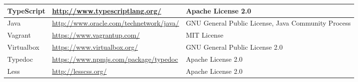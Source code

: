 			\begin{tabularx}{\linewidth}{|p{}|X|p{}|}
				\hline
				TypeScript & \url{http://www.typescriptlang.org/} & Apache License 2.0\\
				\hline
				Java & \url{http://www.oracle.com/technetwork/java/} & GNU General Public License, Java Community Process\\
				\hline
				Vagrant & \url{https://www.vagrantup.com/} & MIT License\\
				\hline
				Virtualbox & \url{https://www.virtualbox.org/} &  GNU General Public License 2.0\\
				\hline
				Typedoc & \url{https://www.npmjs.com/package/typedoc} &  Apache License 2.0\\
				\hline
				Less & \url{http://lesscss.org/} &  Apache License 2.0\\
				\hline
			\end{tabularx}
			
			
